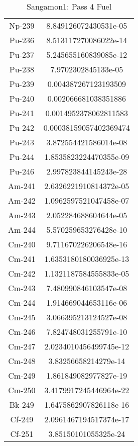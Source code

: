 \begin{table}[h!]
\begin{tabular}{|| c || c |}
Np-239 & 8.849126072430531e-05 \\
Pu-236 & 8.513117270086022e-14 \\
Pu-237 & 5.245655160839085e-12 \\
Pu-238 & 7.9702302845133e-05 \\
Pu-239 & 0.004387267123193509 \\
Pu-240 & 0.002066681038351886 \\
Pu-241 & 0.0014952378062811583 \\
Pu-242 & 0.00038159057402369474 \\
Pu-243 & 3.872554421586014e-08 \\
Pu-244 & 1.8535823224470355e-09 \\
Pu-246 & 2.997823844145243e-28 \\
Am-241 & 2.6326221910814372e-05 \\
Am-242 & 1.0962597521047458e-07 \\
Am-243 & 2.052284688604644e-05 \\
Am-244 & 5.570259653276428e-10 \\
Cm-240 & 9.711670226206548e-16 \\
Cm-241 & 1.6353180180036925e-13 \\
Cm-242 & 1.1321187584555833e-05 \\
Cm-243 & 7.480990846103547e-08 \\
Cm-244 & 1.914669044653116e-06 \\
Cm-245 & 3.066395213124527e-08 \\
Cm-246 & 7.824748031255791e-10 \\
Cm-247 & 2.0234010456499745e-12 \\
Cm-248 & 3.83256658214279e-14 \\
Cm-249 & 1.861849082977827e-19 \\
Cm-250 & 3.4179917245446964e-22 \\
Bk-249 & 1.6475862907826118e-16 \\
Cf-249 & 2.0961467194517374e-17 \\
Cf-251 & 3.85150101055325e-24 \\

\hline
\end{tabular}
\caption{Sangamon1: Pass 4 Fuel}
\label{table:sang1p4fuel}
\end{table}